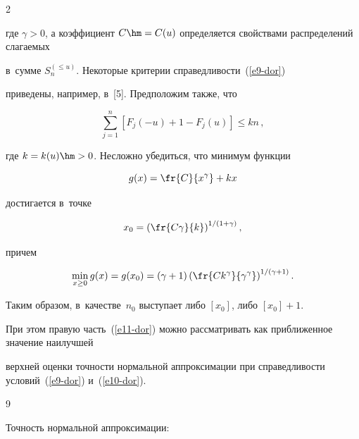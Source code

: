 \begin{multicols}{2}
\begin{equation}
\end{equation}

где $\gamma>0$, а коэффициент $C\hm=C(u)$ определяется свойствами распределений слагаемых 

в~сумме $S_n^{(\le u)}$. Некоторые критерии справедливости~(\ref{e9-dor}) 

приведены, например, в~[5]. Предположим также, что

\begin{equation}

\sum\limits_{j=1}^n\left[F_j(-u)+1-F_j(u)\right]\le kn\,,

\label{e10-dor}\end{equation}

где $k=k(u)\hm>0$. Несложно убедиться, что минимум функции

$$

g(x)=\fr{C}{x^{\gamma}}+kx

$$

достигается в~точке

$$

x_0=\left(\fr{C\gamma}{k}\right)^{{1}/({1+\gamma})},

$$

причем

\begin{equation}

\min\limits_{x\ge0}g(x)=g(x_0)=

(\gamma+1)\left(\fr{Ck^{\gamma}}{\gamma^{\gamma}}\right)^{{1}/({\gamma+1})}.

\label{e11-dor}

\end{equation}

Таким образом, в~качестве~$n_0$ выступает либо $[x_0]$, либо $[x_0]+1$. 

При этом правую часть~(\ref{e11-dor}) можно рассматривать как приближенное значение наилучшей 

верхней оценки точности нормальной аппроксимации при справедливости условий~(\ref{e9-dor}) и~(\ref{e10-dor}).



{\small\frenchspacing

{%


\begin{thebibliography}{9}


 Точность нормальной аппроксимации: 


\end{thebibliography}}}
\end{multicols}
